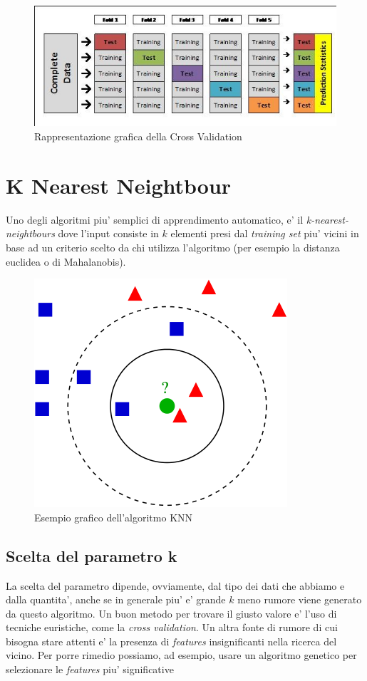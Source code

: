 \begin{figure}[H]
	\centering
	\includegraphics[width=0.7\linewidth]{img/crossvalidation}
	\caption{Rappresentazione grafica della Cross Validation}
	\label{fig:crossvalidation}
\end{figure}


\section*{K Nearest Neightbour}
Uno degli algoritmi piu' semplici di apprendimento automatico, e' il \textit{k-nearest-neightbours} dove l'input consiste in $k$ elementi presi dal \textit{training set} piu' vicini in base ad un criterio scelto da chi utilizza l'algoritmo (per esempio la distanza euclidea o di Mahalanobis).


\begin{figure}[H]
	\centering
	\includegraphics[width=0.7\linewidth]{img/knn_example}
	\caption{Esempio grafico dell'algoritmo KNN}
	\label{fig:knnexample}
\end{figure}


\subsection*{Scelta del parametro k}
La scelta del parametro dipende, ovviamente, dal tipo dei dati che abbiamo e dalla quantita', anche se in generale piu' e' grande $k$ meno rumore viene generato da questo algoritmo. Un buon metodo per trovare il giusto valore e' l'uso di tecniche euristiche, come la \textit{cross validation}. Un altra fonte di rumore di cui bisogna stare attenti e' la presenza di \textit{features} insignificanti nella ricerca del vicino. Per porre rimedio possiamo, ad esempio, usare un algoritmo genetico per selezionare le \textit{features} piu' significative

